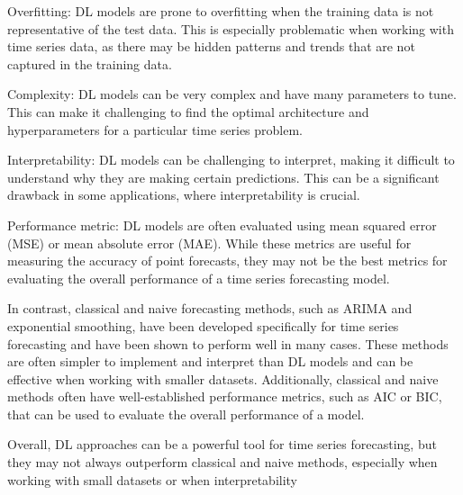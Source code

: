 Overfitting: DL models are prone to overfitting when the training data is not representative of the test data. This is especially problematic when working with time series data, as there may be hidden patterns and trends that are not captured in the training data.

Complexity: DL models can be very complex and have many parameters to tune. This can make it challenging to find the optimal architecture and hyperparameters for a particular time series problem.

Interpretability: DL models can be challenging to interpret, making it difficult to understand why they are making certain predictions. This can be a significant drawback in some applications, where interpretability is crucial.

Performance metric: DL models are often evaluated using mean squared error (MSE) or mean absolute error (MAE). While these metrics are useful for measuring the accuracy of point forecasts, they may not be the best metrics for evaluating the overall performance of a time series forecasting model.

In contrast, classical and naive forecasting methods, such as ARIMA and exponential smoothing, have been developed specifically for time series forecasting and have been shown to perform well in many cases. These methods are often simpler to implement and interpret than DL models and can be effective when working with smaller datasets. Additionally, classical and naive methods often have well-established performance metrics, such as AIC or BIC, that can be used to evaluate the overall performance of a model.

Overall, DL approaches can be a powerful tool for time series forecasting, but they may not always outperform classical and naive methods, especially when working with small datasets or when interpretability
